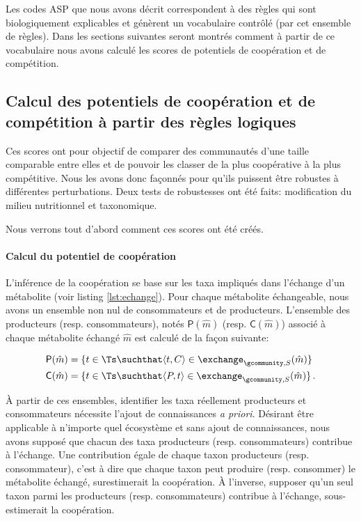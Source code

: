 \documentclass[../main.tex]{subfiles}
\begin{document}
Les codes ASP que nous avons décrit correspondent à des règles qui sont biologiquement explicables et génèrent un vocabulaire contrôlé (par cet ensemble de règles). Dans les sections suivantes seront montrés comment à partir de ce vocabulaire nous avons calculé les scores de potentiels de coopération et de compétition. 

\subsection{Calcul des potentiels de coopération et de compétition à partir des règles logiques}
Ces scores ont pour objectif de comparer des communautés d'une taille comparable entre elles et de pouvoir les classer de la plus coopérative à la plus compétitive. Nous les avons donc façonnés pour qu'ils puissent être robustes à différentes perturbations. Deux tests de robustesses ont été faits: modification du milieu nutritionnel et taxonomique. 

Nous verrons tout d'abord comment ces scores ont été créés.

\paragraph*{Calcul du potentiel de coopération}
L'inférence de la coopération se base sur les taxa impliqués dans l'échange d'un métabolite (voir listing \ref{lst:echange}). Pour chaque métabolite échangeable, nous avons un ensemble non nul de consommateurs et de producteurs. L'ensemble des producteurs (resp. consommateurs), notés $\textsf{P}(\hat{m})$ (resp. $\textsf{C}(\hat{m})$) associé à chaque métabolite échangé $\hat{m}$ est calculé de la façon suivante:

\begin{align}
\begin{split}
    \textsf{P}(\hat{m}) & =
        \{ t\in \Ts \suchthat \langle t, C \rangle \in \exchange_{\gcommunity, S}(\hat{m}) \} \\
    \textsf{C}(\hat{m}) & =
        \{ t\in \Ts \suchthat \langle P, t \rangle \in \exchange_{\gcommunity, S}(\hat{m}) \} \,. 
\end{split}
\end{align}



À partir de ces ensembles, identifier les taxa réellement producteurs et consommateurs nécessite l'ajout de connaissances \textit{a priori}. Désirant être applicable à n'importe quel écosystème et sans ajout de connaissances, nous avons supposé que chacun des taxa producteurs (resp. consommateurs) contribue à l'échange. Une contribution égale de chaque taxon producteurs (resp. consommateur), c'est à dire que chaque taxon peut produire (resp. consommer) le métabolite échangé, surestimerait la coopération. À l'inverse, supposer qu'un seul taxon parmi les producteurs (resp. consommateurs) contribue à l'échange, sous-estimerait la coopération. \\
\end{document}
